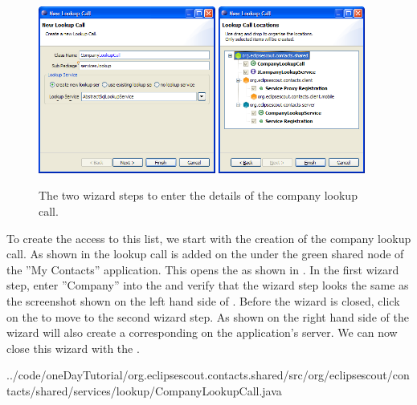 \documentclass[a4paper,10pt,twoside]{book}
\begin{document}
\begin{figure}
\includegraphics[height=5.5cm]{new_lookupcall_company_1.png} \hspace{5mm}
\includegraphics[height=5.5cm]{new_lookupcall_company_2.png}
\caption{The two wizard steps to enter the details of the company lookup call.}
\end{figure}

To create the access to this list, we start with the creation of the company lookup call. 
As shown in  the lookup call is added on the  under the green shared node of the ''My Contacts'' application.
This opens the  as shown in . 
In the first wizard step, enter ''Company'' into the  and verify that the wizard step looks the same as the screenshot shown on the left hand side of .
Before the wizard is closed, click on the  to move to the second wizard step. 
As shown on the right hand side of  the wizard will also create a corresponding  on the application's server. 
We can now close this wizard with the .


{../code/oneDayTutorial/org.eclipsescout.contacts.shared/src/org/eclipsescout/contacts/shared/services/lookup/CompanyLookupCall.java}
\end{document}

